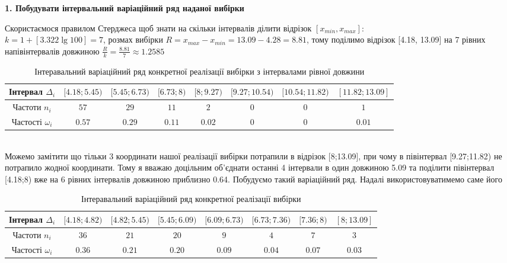\documentclass[11 pt]{article}
\begin{document}
\begin{center}
    \large
    \textbf{1. Побудувати інтервальний варіаційний ряд наданої вибірки}
\end{center}
Скористаємося правилом Стерджеса щоб знати на скільки інтервалів ділити відрізок $[x_{min}, x_{max}]$:\\ 
$k = 1 + [3.322\lg{100}] = 7$, розмах вибірки $R=x_{max}-x_{min}=13.09-4.28=8.81$, тому поділимо
відрізок [4.18, 13.09] на 7 рівних напівінтервалів довжиною $\frac{R}{k}=\frac{8.81}{7}\approx 1.2585$
\\
\begin{table}[h!]
	\begin{center}
		\caption{Інтеравальний варіаційний ряд конкретної реалізації вибірки з інтервалами рівної довжини}
		\begin{tabular}{|c|c|c|c|c|c|c|c|}\hline
			Інтервал $\Delta_i$ & 
            $[4.18; 5.45)$ & $[5.45; 6.73)$ & $[6.73; 8)$ & $[8; 9.27)$ & $[9.27; 10.54)$
            & $[10.54;11.82)$ & $[11.82; 13.09]$   
            \\ \hline
			Частоти $n_i$ &$57$&$29$&$11$&$2$&$0$&$0$&$1$ \\ \hline
			Частості $\omega_i$&$0.57$&$0.29$&$0.11$&$0.02$&$0$&$0$&$0.01$ \\ \hline
		\end{tabular}
	\end{center}
\end{table}
\\
Можемо замітити що тільки 3 координати нашої реалізації вибірки потрапили в відрізок [8;13.09],
при чому в півінтервал [9.27;11.82) не потрапило жодної координати. Тому я вважаю доцільним об'єднати
останні 4 інтервали в один довжиною 5.09 та поділити півінтервал [4.18;8) вже на 6 рівних інтервалів
довжиною приблизно 0.64. Побудуємо такий варіаційний ряд. Надалі використовуватимемо саме його\\
\begin{table}[h!]
	\begin{center}
		\caption{Інтеравальний варіаційний ряд конкретної реалізації вибірки}
		\begin{tabular}{|c|c|c|c|c|c|c|c|}\hline
			Інтервал $\Delta_i$ & 
            $[4.18; 4.82)$ & $[4.82; 5.45)$ & $[5.45; 6.09)$ & $[6.09; 6.73)$ & $[6.73; 7.36)$
            & $[7.36;8)$ & $[8; 13.09]$   
            \\ \hline
			Частоти $n_i$ &$36$&$21$&$20$&$9$&$4$&$7$&$3$ \\ \hline
			Частості $\omega_i$&$0.36$&$0.21$&$0.20$&$0.09$&$0.04$&$0.07$&$0.03$ \\ \hline
		\end{tabular}
	\end{center}
\end{table}
\end{document}
